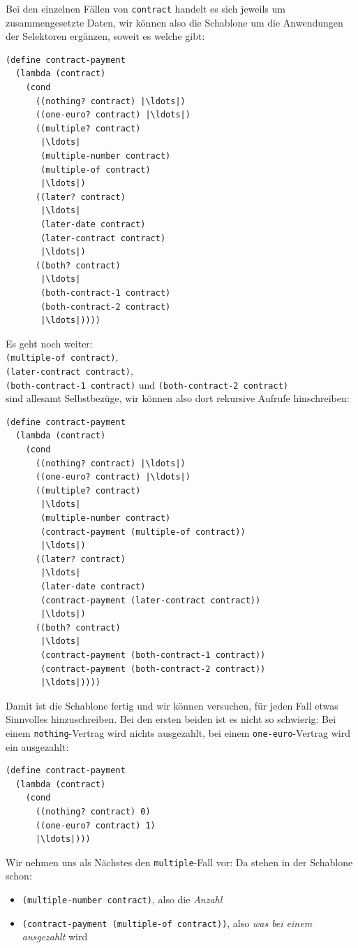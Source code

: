 %
Bei den einzelnen Fällen von \lstinline{contract} handelt es sich
jeweils um zusammengesetzte Daten, wir können also die Schablone um
die Anwendungen der Selektoren ergänzen, soweit es welche gibt:
%
\begin{lstlisting}
(define contract-payment
  (lambda (contract)
    (cond
      ((nothing? contract) |\ldots|)
      ((one-euro? contract) |\ldots|)
      ((multiple? contract)
       |\ldots|
       (multiple-number contract)
       (multiple-of contract)
       |\ldots|)
      ((later? contract)
       |\ldots|
       (later-date contract)
       (later-contract contract)
       |\ldots|)
      ((both? contract)
       |\ldots|
       (both-contract-1 contract)
       (both-contract-2 contract)
       |\ldots|))))
\end{lstlisting}
%
Es geht noch weiter:\\
\lstinline{(multiple-of contract)},\\
\lstinline{(later-contract contract)},\\
\lstinline{(both-contract-1 contract)}  und \lstinline{(both-contract-2 contract)} \\
sind allesamt
Selbstbezüge, wir können also dort rekursive Aufrufe hinschreiben:
%
\begin{lstlisting}
(define contract-payment
  (lambda (contract)
    (cond
      ((nothing? contract) |\ldots|)
      ((one-euro? contract) |\ldots|)
      ((multiple? contract)
       |\ldots|
       (multiple-number contract)
       (contract-payment (multiple-of contract))
       |\ldots|)
      ((later? contract)
       |\ldots|
       (later-date contract)
       (contract-payment (later-contract contract))
       |\ldots|)
      ((both? contract)
       |\ldots|
       (contract-payment (both-contract-1 contract))
       (contract-payment (both-contract-2 contract))
       |\ldots|))))
\end{lstlisting}
%
Damit ist die Schablone fertig und wir können versuchen, für jeden Fall
etwas Sinnvolles hinzuschreiben.  Bei den ersten beiden ist es nicht
so schwierig: Bei einem \lstinline{nothing}-Vertrag wird nichts
ausgezahlt, bei einem \lstinline{one-euro}-Vertrag wird ein 
ausgezahlt:
%
\begin{lstlisting}
(define contract-payment
  (lambda (contract)
    (cond
      ((nothing? contract) 0)
      ((one-euro? contract) 1)
      |\ldots|)))
\end{lstlisting}
%
Wir nehmen uns als Nächstes den \lstinline{multiple}-Fall vor: Da
stehen in der Schablone schon:
\begin{itemize}
\item\lstinline{(multiple-number contract)}, also die \emph{Anzahl}
\item\lstinline{(contract-payment (multiple-of contract))}, also
  \emph{was bei einem ausgezahlt} wird
\end{itemize}
